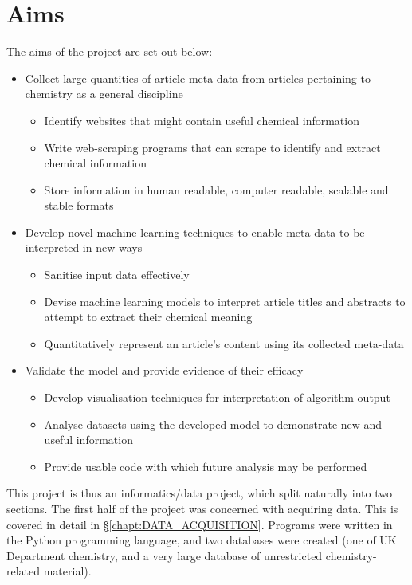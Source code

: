 \section{Aims}
The aims of the project are set out below:
\begin{itemize}
\item Collect large quantities of article meta-data from articles pertaining to chemistry as a general discipline
\begin{itemize}
\item Identify websites that might contain useful chemical information
\item Write web-scraping programs that can scrape to identify and extract chemical information
\item Store information in human readable, computer readable, scalable and stable formats
\end{itemize}
\item Develop novel machine learning techniques to enable meta-data to be interpreted in new ways
\begin{itemize}
\itemsep0em 
\item Sanitise input data effectively
\item Devise  machine learning models to interpret article titles and abstracts to attempt to extract their chemical meaning
\item Quantitatively represent an article's content using its collected meta-data
\end{itemize}
\item Validate the model and provide evidence of their efficacy
\begin{itemize}
\item Develop visualisation techniques for interpretation of algorithm output
\item Analyse datasets using the developed model to demonstrate new and useful information
\item Provide usable code with which future analysis may be performed
\end{itemize}
\end{itemize}
This project is thus an informatics/data project, which split naturally into two sections. The first half of the project was concerned with acquiring data. This is covered in detail in \S\ref{chapt:DATA_ACQUISITION}.
Programs were written in the Python programming language, and two databases were created (one of UK Department chemistry, and a very large database of unrestricted chemistry-related material).

